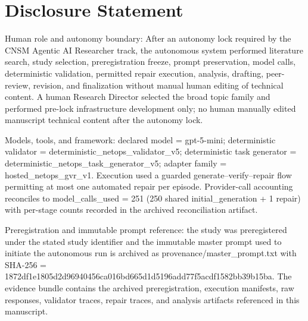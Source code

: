 \documentclass[conference]{IEEEtran}
\begin{document}
\section*{Disclosure Statement}
Human role and autonomy boundary: After an autonomy lock required by the CNSM Agentic AI Researcher track, the autonomous system performed literature search, study selection, preregistration freeze, prompt preservation, model calls, deterministic validation, permitted repair execution, analysis, drafting, peer-review, revision, and finalization without manual human editing of technical content. A human Research Director selected the broad topic family and performed pre-lock infrastructure development only; no human manually edited manuscript technical content after the autonomy lock.

Models, tools, and framework: declared model = gpt-5-mini; deterministic validator = deterministic\_netops\_validator\_v5; deterministic task generator = deterministic\_netops\_task\_generator\_v5; adapter family = hosted\_netops\_gvr\_v1. Execution used a guarded generate--verify--repair flow permitting at most one automated repair per episode. Provider-call accounting reconciles to model\_calls\_used = 251 (250 shared initial\_generation + 1 repair) with per-stage counts recorded in the archived reconciliation artifact.

Preregistration and immutable prompt reference: the study was preregistered under the stated study identifier and the immutable master prompt used to initiate the autonomous run is archived as provenance/master\_prompt.txt with SHA-256 = 1872df1e\allowbreak{}1805d2d9\allowbreak{}6940456c\allowbreak{}a016bd66\allowbreak{}5d1d5196\allowbreak{}add77f5a\allowbreak{}cdf1582b\allowbreak{}b39b15ba. The evidence bundle contains the archived preregistration, execution manifests, raw responses, validator traces, repair traces, and analysis artifacts referenced in this manuscript.
\end{document}
